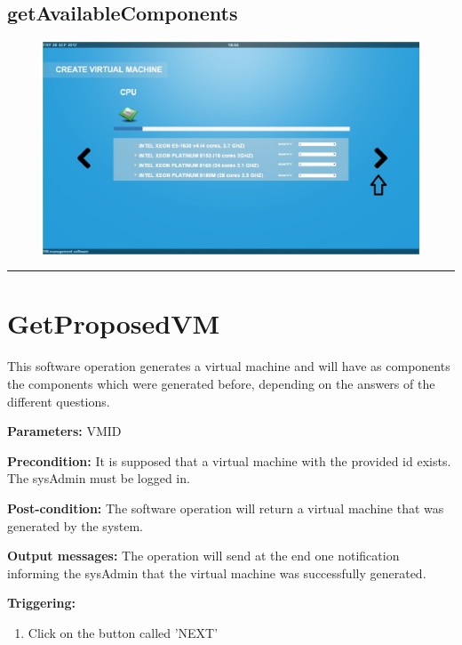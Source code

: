 \subsection{getAvailableComponents}

\begin{figure}[H]
\centering
\includegraphics[width=170mm]{images/softAvailable.eps}
\caption{\label{overflow}}
\end{figure}


\hrule
\vspace{0.5cm}








\section{GetProposedVM}
\label{operation:GetProposedVM}
This software operation generates a virtual machine and will have as components
the components which were generated before, depending on the answers of the
different questions.
\begin{description}

\item \textbf{Parameters:} VMID
\item \textbf{Precondition:} It is supposed that a virtual machine with the
provided id exists. The sysAdmin must be logged in.
\item \textbf{Post-condition:} The software operation will return a virtual
machine that was generated by the system.
\item \textbf{Output messages:} The operation will send at the end one
notification informing the sysAdmin that the virtual machine was successfully
generated.

\item \textbf{Triggering:}
\begin{enumerate}
\item Click on the button called 'NEXT'
\end{enumerate}

 
\end{description}

